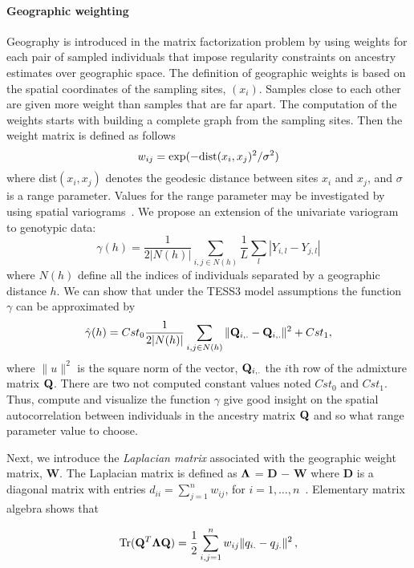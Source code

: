  \paragraph{Geographic weighting} Geography is introduced in the matrix factorization problem by using weights for each pair of sampled individuals that impose regularity constraints on ancestry estimates over geographic space. The definition of geographic weights is based on the spatial coordinates of the sampling sites, $(x_i)$. Samples close to each other are given more weight than samples that are far apart. The computation of the weights starts with building a complete graph from the sampling sites. Then the weight matrix is defined as follows
$$
w_{ij} = \exp( - {\rm dist}( x_i, x_j )^2/ \sigma^2)
$$
\noindent where dist$( x_i, x_j )$ denotes the geodesic distance between sites $x_i$ and  $x_j$, and $\sigma$ is a range parameter. Values for the range parameter may be investigated by using spatial variograms~\citep{Cressie1993}. We propose an extension of the univariate variogram to genotypic data:
\begin{equation}
\gamma(h) = \frac{1}{2 |N(h)|} \sum_{i,j \in N(h)} \frac{1}{L} \sum_{l} |Y_{i,l} - Y_{j,l}|
\label{eq:gamma}
\end{equation}
\noindent where $N(h)$ define all the indices of individuals separated by a geographic distance $h$. We can show that under the TESS3 model assumptions the function $\gamma$ can be approximated by 
\begin{equation}
\hat{\gamma}(h) = {Cst}_0 \frac{1}{2 |N(h)|} \sum_{i,j \in N(h)} \| {\bf Q}_{i,.} - {\bf Q}_{i,.}\|^2 + {Cst}_1, 
\label{eq:gammahat}
\end{equation}
\noindent where $\|  u \|^2$ is the square norm of the vector, ${\bf Q}_{i,.}$ the $i$th row of the admixture matrix ${\bf Q}$. There are two not computed constant values noted ${Cst}_0$ and ${Cst}_1$. Thus, compute and visualize the function $\gamma$ give good insight on the spatial autocorrelation between individuals in the ancestry matrix ${\bf Q}$ and so what range parameter value to choose.

Next, we introduce the {\it Laplacian matrix} associated with the geographic weight matrix, {\bf W}. The Laplacian matrix is defined as ${\bf \Lambda}$ =  {\bf D} $-$ {\bf W}  where  {\bf D} is a diagonal matrix with entries 
$d_{ii} = \sum_{j = 1}^n w_{ij}$,  for  $i = 1, \dots, n$~\citep{Belkin2003}. Elementary matrix algebra shows that 

$$
 {\rm Tr} ({\bf Q}^T {\bf \Lambda} {\bf Q})  = \frac12 \sum_{i,j = 1}^n  w_{ij}  \|   q_{i.}  - q_{j.} \|^2 \, ,
$$

